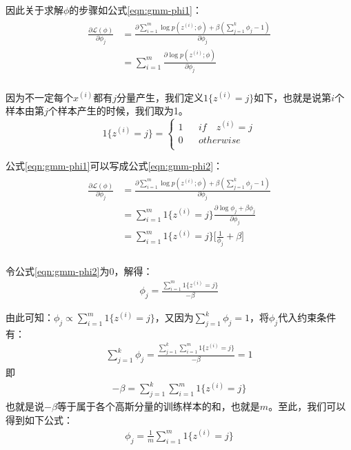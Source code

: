 因此关于求解$\phi$的步骤如公式\ref{eqn:gmm-phi1}：
\begin{align}
\label{eqn:gmm-phi1}
\begin{split}
  \frac{\partial \mathcal{L}(\phi)}{\partial \phi_j}
  &=\frac{\partial \sum_{i=1}^{m} \log p(z^{(i)};\phi) + \beta(\sum_{j=1}^{k} \phi_{j}-1)}{\partial \phi_j} \\
  &= \sum_{i=1}^{m} \frac{\partial \log p(z^{(i)};\phi)}{\partial \phi_j} \\
\end{split}
\end{align}

因为不一定每个$x^{(i)}$都有$j$分量产生，我们定义$1\{z^{(i)}=j\}$如下，也就是说第$i$个样本由第$j$个样本产生的时候，我们取为1。
\begin{equation}
1\{z^{(i)}=j\}=\left\{
\begin{array}{rcl}
1& & if \quad z^{(i)}=j\\
0 & & otherwise\\
\end{array} \right.
\end{equation}

公式\ref{eqn:gmm-phi1}可以写成公式\ref{eqn:gmm-phi2}：
\begin{align}
\label{eqn:gmm-phi2}
\begin{split}
  \frac{\partial \mathcal{L}(\phi)}{\partial \phi_j}
  &=\frac{\partial \sum_{i=1}^{m} \log p(z^{(i)};\phi) + \beta(\sum_{j=1}^{k} \phi_{j}-1)}{\partial \phi_j} \\
  &= \sum_{i=1}^{m} 1\{z^{(i)}=j\} \frac{\partial \log \phi_j + \beta{\phi_{j}}}{\partial \phi_j} \\
  &= \sum_{i=1}^{m} 1\{z^{(i)}=j\} \Big[ \frac{1}{\phi_j} + \beta \Big]\\
\end{split}
\end{align}

令公式\ref{eqn:gmm-phi2}为0，解得：
\begin{align}
  \phi_j = \frac{\sum_{i=1}^{m} 1\{z^{(i)}=j\}}{-\beta}
\end{align}

由此可知：$\phi_j \propto \sum_{i=1}^{m} 1\{z^{(i)}=j\}$，又因为$\sum_{j=1}^{k} \phi_{j}=1$，将$\phi_j$代入约束条件有：
\begin{align}
  \sum_{j=1}^{k} \phi_j = \frac{ \sum_{j=1}^{k} \sum_{i=1}^{m} 1\{z^{(i)}=j\}}{-\beta} =1
\end{align}
即
\begin{align}
  -\beta = \sum_{j=1}^{k} \sum_{i=1}^{m} 1\{z^{(i)}=j\}
\end{align}
也就是说$-\beta$等于属于各个高斯分量的训练样本的和，也就是$m$。至此，我们可以得到如下公式：
\begin{align}
  \phi_j = \frac{1}{m}\sum_{i=1}^{m} 1\{z^{(i)}=j\}
\end{align}

